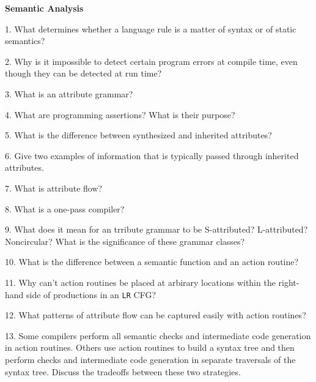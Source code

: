 \centerline{\bf Semantic Analysis}

\vskip 1cm

1. What determines whether a language rule is a matter of syntax or of static semantics?

\filbreak
\vskip 1cm

2. Why is it impossible to detect certain program errors at compile time, even though they can be detected at run time?

\filbreak
\vskip 1cm

3. What is an attribute grammar?

\filbreak
\vskip 1cm

4. What are programming assertions? What is their purpose?

\filbreak
\vskip 1cm

5. What is the difference between synthesized and inherited attributes?

\filbreak
\vskip 1cm

6. Give two examples of information that is typically passed through inherited attributes.

\filbreak
\vskip 1cm

7. What is attribute flow?

\filbreak
\vskip 1cm

8. What is a one-pass compiler?

\filbreak
\vskip 1cm

9. What does it mean for an trribute grammar to be S-attributed? L-attributed? Noncircular? What is the significance of these grammar classes?

\filbreak
\vskip 1cm

10. What is the difference between a semantic function and an action routine?

\filbreak
\vskip 1cm

11. Why can't action routines be placed at arbirary locations within the right-hand side of productions in an {\tt  LR} CFG?

\filbreak
\vskip 1cm

12. What patterns of attribute flow can be captured easily with action routines?

\filbreak
\vskip 1cm

13. Some compilers perform all semantic checks and intermediate code generation in action routines. Others use action routines to build a syntax tree and then perform checks and intermediate code generation in separate traversals of the syntax tree. Discuss the tradeoffs between these two strategies.

